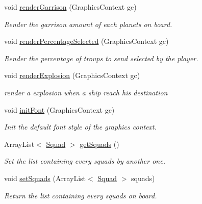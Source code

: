\begin{DoxyCompactItemize}
void \mbox{\hyperlink{classfr_1_1groupe40_1_1projet_1_1model_1_1board_1_1_galaxy_adbfc5609c012349d89f33849aa2787b0}{render\+Garrison}} (Graphics\+Context gc)
\begin{DoxyCompactList}\small\item\em Render the garrison amount of each planets on board. \end{DoxyCompactList}\item 
void \mbox{\hyperlink{classfr_1_1groupe40_1_1projet_1_1model_1_1board_1_1_galaxy_ab7d878b625cbb910e7eb20d0b3b3c260}{render\+Percentage\+Selected}} (Graphics\+Context gc)
\begin{DoxyCompactList}\small\item\em Render the percentage of troups to send selected by the player. \end{DoxyCompactList}\item 
void \mbox{\hyperlink{classfr_1_1groupe40_1_1projet_1_1model_1_1board_1_1_galaxy_aabdca1530440c8acec7f50c30af1a805}{render\+Explosion}} (Graphics\+Context gc)
\begin{DoxyCompactList}\small\item\em render a explosion when a ship reach his destination \end{DoxyCompactList}\item 
void \mbox{\hyperlink{classfr_1_1groupe40_1_1projet_1_1model_1_1board_1_1_galaxy_afcc91fd13d372426cae4eca41e115a11}{init\+Font}} (Graphics\+Context gc)
\begin{DoxyCompactList}\small\item\em Init the default font style of the graphics context. \end{DoxyCompactList}\item 
Array\+List$<$ \mbox{\hyperlink{classfr_1_1groupe40_1_1projet_1_1model_1_1ships_1_1_squad}{Squad}} $>$ \mbox{\hyperlink{classfr_1_1groupe40_1_1projet_1_1model_1_1board_1_1_galaxy_a76035e4de1484dfba7daf377127f80c0}{get\+Squads}} ()
\begin{DoxyCompactList}\small\item\em Set the list containing every squads by another one. \end{DoxyCompactList}\item 
void \mbox{\hyperlink{classfr_1_1groupe40_1_1projet_1_1model_1_1board_1_1_galaxy_a598d42d4b1e24f23d1e004a2e69c8959}{set\+Squads}} (Array\+List$<$ \mbox{\hyperlink{classfr_1_1groupe40_1_1projet_1_1model_1_1ships_1_1_squad}{Squad}} $>$ squads)
\begin{DoxyCompactList}\small\item\em Return the list containing every squads on board. \end{DoxyCompactList}\item 

\end{DoxyCompactItemize}
